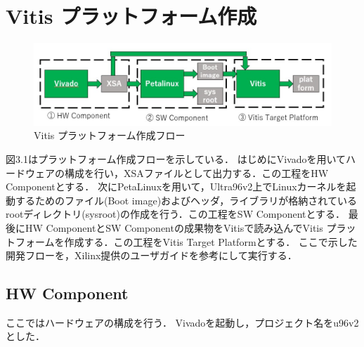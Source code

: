 \documentclass[11pt,a4j]{jreport}
\begin{document}
\section{Vitis プラットフォーム作成}
\begin{figure}[H]
  \center
  \includegraphics[scale = 0.8]{pict/pict.jpg}
  \caption{Vitis プラットフォーム作成フロー}
\end{figure}
図3.1はプラットフォーム作成フローを示している．
はじめにVivadoを用いてハードウェアの構成を行い，XSAファイルとして出力する．この工程をHW Componentとする．
次にPetaLinuxを用いて，Ultra96v2上でLinuxカーネルを起動するためのファイル(Boot image)およびヘッダ，ライブラリが格納されている
rootディレクトリ(sysroot)の作成を行う．この工程をSW Componentとする．
最後にHW ComponentとSW Componentの成果物をVitisで読み込んでVitis プラットフォームを作成する．この工程をVitis Target Platformとする．
ここで示した開発フローを，Xilinx提供のユーザガイド\cite{Xilinx-platform}を参考にして実行する．

\subsection{HW Component}
ここではハードウェアの構成を行う．
Vivadoを起動し，プロジェクト名をu96v2とした．
\end{document}
